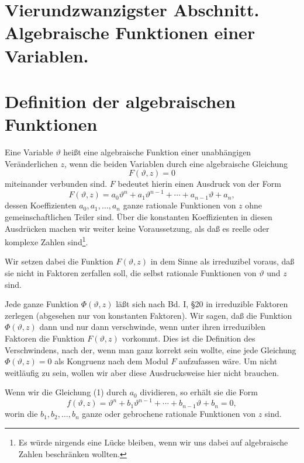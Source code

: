 \documentclass[12pt,a4paper]{article}
\theoremstyle{definition}
\begin{document}
\newpage
\section*{Vierundzwanzigster Abschnitt. Algebraische Funktionen einer Variablen.}

\section{Definition der algebraischen Funktionen}


Eine Variable $\vartheta$ heißt eine algebraische Funktion einer unabhängigen Veränderlichen $z$, wenn die beiden Variablen durch eine algebraische Gleichung
\begin{equation}
F(\vartheta, z) = 0
\end{equation}
miteinander verbunden sind. $F$ bedeutet hierin einen Ausdruck von der Form
\begin{equation}
F(\vartheta, z) = a_0 \vartheta^n + a_1 \vartheta^{n-1} + \cdots + a_{n-1}\vartheta + a_n,
\end{equation}
dessen Koeffizienten $a_0, a_1, \ldots, a_n$ ganze rationale Funktionen von $z$ ohne gemeinschaftlichen Teiler sind. Über die konstanten Koeffizienten in diesen Ausdrücken machen wir weiter keine Voraussetzung, als daß es reelle oder komplexe Zahlen sind\footnote{Es würde nirgends eine Lücke bleiben, wenn wir uns dabei auf algebraische Zahlen beschränken wollten.}.

Wir setzen dabei die Funktion $F(\vartheta, z)$ in dem Sinne als irreduzibel voraus, daß sie nicht in Faktoren zerfallen soll, die selbst rationale Funktionen von $\vartheta$ und $z$ sind.

Jede ganze Funktion $\Phi(\vartheta, z)$ läßt sich nach Bd. I, \S 20 in irreduzible Faktoren zerlegen (abgesehen nur von konstanten Faktoren). Wir sagen, daß die Funktion $\Phi(\vartheta, z)$ dann und nur dann verschwinde, wenn unter ihren irreduziblen Faktoren die Funktion $F(\vartheta, z)$ vorkommt. Dies ist die Definition des Verschwindens, nach der, wenn man ganz korrekt sein wollte, eine jede Gleichung $\Phi(\vartheta, z) = 0$ als Kongruenz nach dem Modul $F$ aufzufassen wäre. Um nicht weitläufig zu sein, wollen wir aber diese Ausdrucksweise hier nicht brauchen.

Wenn wir die Gleichung (1) durch $a_0$ dividieren, so erhält sie die Form
\begin{equation}
f(\vartheta, z) = \vartheta^n + b_1 \vartheta^{n-1} + \cdots + b_{n-1}\vartheta + b_n = 0,
\end{equation}
worin die $b_1, b_2, \ldots, b_n$ ganze oder gebrochene rationale Funktionen von $z$ sind.
\end{document}
